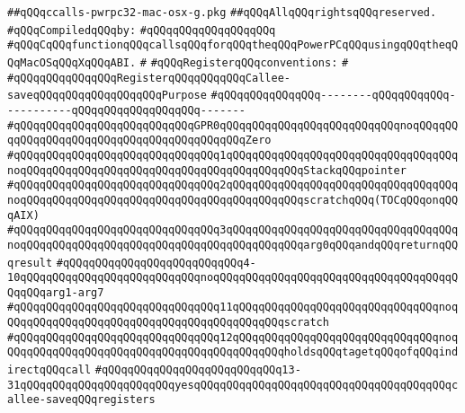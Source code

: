 \label{src/lib/compiler/back/low/pwrpc32/ccalls/ccalls-pwrpc32-mac-osx-g.pkg}
\verb|##qQQqccalls-pwrpc32-mac-osx-g.pkg|\newline
\verb|##qQQqAllqQQqrightsqQQqreserved.|\newline
\newline
\verb|#qQQqCompiledqQQqby:|\newline
\verb|#qQQqqQQqqQQqqQQqqQQq|\newline
\newline
\verb|#qQQqCqQQqfunctionqQQqcallsqQQqforqQQqtheqQQqPowerPCqQQqusingqQQqtheqQQqMacOSqQQqXqQQqABI.|\newline
\verb|#|\newline
\verb|#qQQqRegisterqQQqconventions:|\newline
\verb|#|\newline
\verb|#qQQqqQQqqQQqqQQqRegisterqQQqqQQqqQQqCallee-saveqQQqqQQqqQQqqQQqqQQqPurpose|\newline
\verb|#qQQqqQQqqQQqqQQq--------qQQqqQQqqQQq-----------qQQqqQQqqQQqqQQqqQQq-------|\newline
\verb|#qQQqqQQqqQQqqQQqqQQqqQQqqQQqGPR0qQQqqQQqqQQqqQQqqQQqqQQqqQQqnoqQQqqQQqqQQqqQQqqQQqqQQqqQQqqQQqqQQqqQQqqQQqZero|\newline
\verb|#qQQqqQQqqQQqqQQqqQQqqQQqqQQqqQQq1qQQqqQQqqQQqqQQqqQQqqQQqqQQqqQQqqQQqnoqQQqqQQqqQQqqQQqqQQqqQQqqQQqqQQqqQQqqQQqqQQqStackqQQqpointer|\newline
\verb|#qQQqqQQqqQQqqQQqqQQqqQQqqQQqqQQq2qQQqqQQqqQQqqQQqqQQqqQQqqQQqqQQqqQQqnoqQQqqQQqqQQqqQQqqQQqqQQqqQQqqQQqqQQqqQQqqQQqscratchqQQq(TOCqQQqonqQQqAIX)|\newline
\verb|#qQQqqQQqqQQqqQQqqQQqqQQqqQQqqQQq3qQQqqQQqqQQqqQQqqQQqqQQqqQQqqQQqqQQqnoqQQqqQQqqQQqqQQqqQQqqQQqqQQqqQQqqQQqqQQqqQQqarg0qQQqandqQQqreturnqQQqresult|\newline
\verb|#qQQqqQQqqQQqqQQqqQQqqQQqqQQq4-10qQQqqQQqqQQqqQQqqQQqqQQqqQQqnoqQQqqQQqqQQqqQQqqQQqqQQqqQQqqQQqqQQqqQQqqQQqarg1-arg7|\newline
\verb|#qQQqqQQqqQQqqQQqqQQqqQQqqQQqqQQq11qQQqqQQqqQQqqQQqqQQqqQQqqQQqqQQqnoqQQqqQQqqQQqqQQqqQQqqQQqqQQqqQQqqQQqqQQqqQQqscratch|\newline
\verb|#qQQqqQQqqQQqqQQqqQQqqQQqqQQqqQQq12qQQqqQQqqQQqqQQqqQQqqQQqqQQqqQQqnoqQQqqQQqqQQqqQQqqQQqqQQqqQQqqQQqqQQqqQQqqQQqholdsqQQqtagetqQQqofqQQqindirectqQQqcall|\newline
\verb|#qQQqqQQqqQQqqQQqqQQqqQQqqQQq13-31qQQqqQQqqQQqqQQqqQQqqQQqyesqQQqqQQqqQQqqQQqqQQqqQQqqQQqqQQqqQQqqQQqcallee-saveqQQqregisters|\newline
